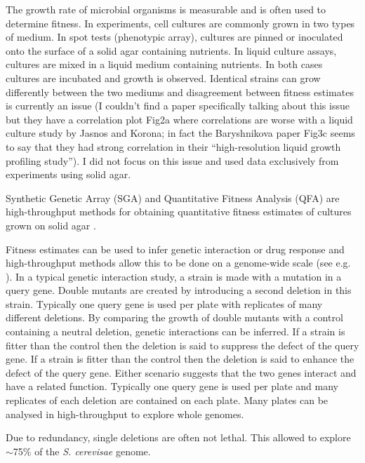 The growth rate of microbial organisms is measurable and is often used
to determine fitness. In experiments, cell cultures are commonly grown
in two types of medium. In spot tests (phenotypic array), cultures
are pinned or inoculated onto the surface of a solid agar containing
nutrients. In liquid culture assays, cultures are mixed in a liquid
medium containing nutrients. In both cases cultures are incubated and
growth is observed. Identical strains can grow differently between the
two mediums and disagreement between fitness estimates is currently an
issue \citet{Baryshnikova2010} (I couldn't find a paper specifically
talking about this issue but they have a correlation plot Fig2a where
correlations are worse with a liquid culture study by Jasnos and
Korona; in fact the Baryshnikova paper Fig3c seems to say that they
had strong correlation in their ``high-resolution liquid growth
profiling study''). I did not focus on this issue and used data
exclusively from experiments using solid agar.


Synthetic Genetic Array (SGA) and Quantitative Fitness Analysis (QFA)
are high-throughput methods for obtaining quantitative fitness
estimates of cultures grown on solid agar
\citep{Baryshnikova2010sga,Banks2012}.

Fitness estimates can be used to infer genetic interaction or drug
response and high-throughput methods allow this to be done on a
genome-wide scale (see e.g. \citet{Costanzo2010}). In a typical
genetic interaction study, a strain is made with a mutation in a query
gene. Double mutants are created by introducing a second deletion in
this strain. Typically one query gene is used per plate with
replicates of many different deletions. By comparing the growth of
double mutants with a control containing a neutral deletion, genetic
interactions can be inferred. If a strain is fitter than the control
then the deletion is said to suppress the defect of the query gene. If
a strain is fitter than the control then the deletion is said to
enhance the defect of the query gene. Either scenario suggests that
the two genes interact and have a related function. Typically one
query gene is used per plate and many replicates of each deletion are
contained on each plate. Many plates can be analysed in
high-throughput to explore whole genomes.



Due to redundancy, single deletions are often not lethal. This allowed
\citet{Costanzo2010} to explore \(\sim\)75\% of the \textit{S. cerevisae}
genome.






